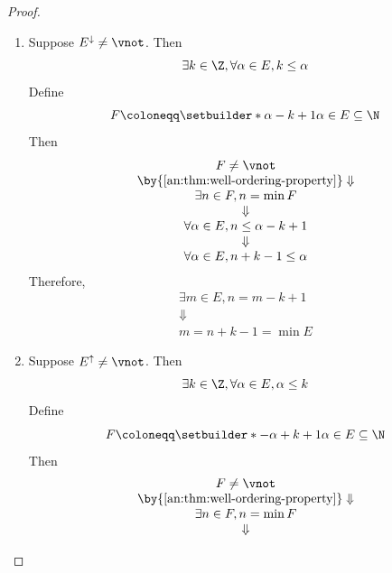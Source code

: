 \begin{proof}
  \leavevmode\par
  \begin{enumerate}[label=\textbf{(\Alph*)}]
    \item Suppose $E^{\downarrow} \neq \vnot$. Then
          \[
            \exists k \in \Z, \forall \alpha \in E, k \leq \alpha
          \]
          Define
          \[
            F \coloneqq \setbuilder*{\alpha - k + 1}{\alpha \in E} \subseteq \N
          \]
          Then
          \[
            \begin{array}{c}
              F \neq \vnot                                         \\
              \by{\Cref{an:thm:well-ordering-property}} \Downarrow \\
              \exists n \in F, n = \min F                          \\
              \Downarrow                                           \\
              \forall \alpha \in E, n \leq \alpha - k + 1          \\
              \Downarrow                                           \\
              \forall \alpha \in E, n + k - 1 \leq \alpha
            \end{array}
          \]
          Therefore,
          \[
            \begin{array}{c}
              \exists m \in E, n = m - k + 1 \\
              \Downarrow                     \\
              m = n + k - 1 = \min E
            \end{array}
          \]
    \item Suppose $E^{\uparrow} \neq \vnot$. Then
          \[
            \exists k \in \Z, \forall \alpha \in E, \alpha \leq k
          \]
          Define
          \[
            F \coloneqq \setbuilder*{- \alpha + k + 1}{\alpha \in E} \subseteq \N
          \]
          Then
          \[
            \begin{array}{c}
              F \neq \vnot                                         \\
              \by{\Cref{an:thm:well-ordering-property}} \Downarrow \\
              \exists n \in F, n = \min F                          \\
              \Downarrow                                           \\

\end{array}\]
\end{enumerate}
\end{proof}
